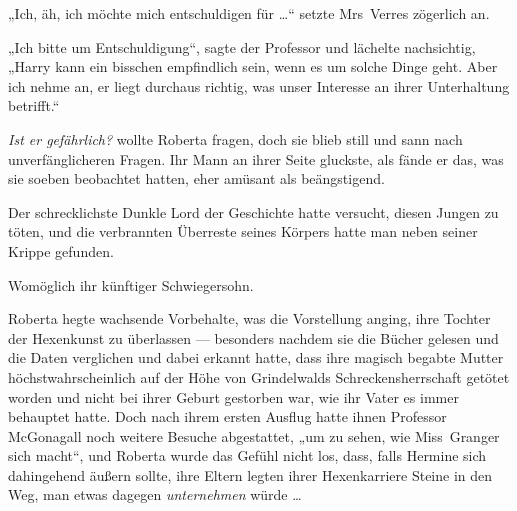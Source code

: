 „Ich, äh, ich möchte mich entschuldigen für …“ setzte Mrs~Verres zögerlich an.

„Ich bitte um Entschuldigung“, sagte der Professor und lächelte nachsichtig,
„Harry kann ein bisschen empfindlich sein, wenn es um solche Dinge geht. Aber ich nehme an, er liegt durchaus richtig, was unser Interesse an ihrer Unterhaltung betrifft.“

\emph{Ist er gefährlich?} wollte Roberta fragen, doch sie blieb still und sann nach unverfänglicheren Fragen. Ihr Mann an ihrer Seite gluckste, als fände er das, was sie soeben beobachtet hatten, eher amüsant als beängstigend.

Der schrecklichste Dunkle Lord der Geschichte hatte versucht, diesen Jungen zu töten, und die verbrannten Überreste seines Körpers hatte man neben seiner Krippe gefunden.

Womöglich ihr künftiger Schwiegersohn.

Roberta hegte wachsende Vorbehalte, was die Vorstellung anging, ihre Tochter der Hexenkunst zu überlassen — besonders nachdem sie die Bücher gelesen und die Daten verglichen und dabei erkannt hatte, dass ihre magisch begabte Mutter höchstwahrscheinlich auf der Höhe von Grindelwalds Schreckensherrschaft getötet worden und nicht bei ihrer Geburt gestorben war, wie ihr Vater es immer behauptet hatte. Doch nach ihrem ersten Ausflug hatte ihnen Professor McGonagall noch weitere Besuche abgestattet, „um zu sehen, wie Miss~Granger sich macht“, und Roberta wurde das Gefühl nicht los, dass, falls Hermine sich dahingehend äußern sollte, ihre Eltern legten ihrer Hexenkarriere Steine in den Weg, man etwas dagegen \emph{unternehmen} würde …

